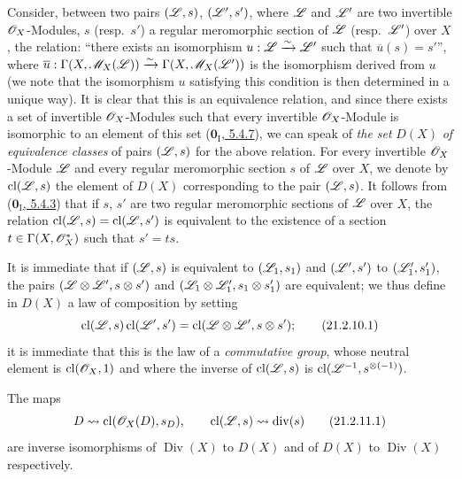 \begin{env}[21.2.10]
\label{IV.21.2.10}
Consider, between two pairs $(\mathscr{L},s)$, $(\mathscr{L}',s')$, where $\mathscr{L}$ and $\mathscr{L}'$ are two invertible $\mathscr{O}_X$-Modules, $s$ (resp.\ $s'$) a regular meromorphic section of $\mathscr{L}$ (resp.\ $\mathscr{L}'$) over $X$, the relation:
``there exists an isomorphism $u:\mathscr{L}\xrightarrow{\sim}\mathscr{L}'$ such that $\overline{u}(s)=s'$'',
where $\overline{u}:\Gamma(X,\mathscr{M}_X(\mathscr{L}))\xrightarrow{\sim}\Gamma(X,\mathscr{M}_X(\mathscr{L}'))$ is the isomorphism derived from $u$ (we note that the isomorphism $u$ satisfying this condition is then determined in a unique way).
It is clear that this is an equivalence relation, and since there exists a set of invertible $\mathscr{O}_X$-Modules such that every invertible $\mathscr{O}_X$-Module is isomorphic to an element of this set (\hyperref[0.5.4.7]{$\mathbf{0}_{\mathrm{I}}$, 5.4.7}), we can speak of \emph{the set} $D(X)$ \emph{of equivalence classes} of pairs $(\mathscr{L},s)$ for the above relation.
For every invertible $\mathscr{O}_X$-Module $\mathscr{L}$ and every regular meromorphic section
$s$ of $\mathscr{L}$ over $X$, we denote by $\operatorname{cl}(\mathscr{L},s)$ the element of $D(X)$ corresponding to the pair $(\mathscr{L},s)$.
It follows from (\hyperref[0.5.4.3]{$\mathbf{0}_{\mathrm{I}}$, 5.4.3}) that if $s$, $s'$ are two regular meromorphic sections of $\mathscr{L}$ over $X$, the relation $\operatorname{cl}(\mathscr{L},s)=\operatorname{cl}(\mathscr{L},s')$ is equivalent to the existence of a section $t\in\Gamma(X,\mathscr{O}_X^*)$ such that $s'=ts$.

It is immediate that if $(\mathscr{L},s)$ is equivalent to $(\mathscr{L}_1,s_1)$ and $(\mathscr{L}',s')$ to $(\mathscr{L}_1',s_1')$, the pairs $(\mathscr{L}\otimes\mathscr{L}',s\otimes s')$ and $(\mathscr{L}_1\otimes\mathscr{L}_1',s_1\otimes s_1')$ are equivalent;
we thus define in $D(X)$ a law of composition by setting
\[
\label{IV.21.2.10.1}
  \operatorname{cl}(\mathscr{L},s)\operatorname{cl}(\mathscr{L}',s')=\operatorname{cl}(\mathscr{L}\otimes\mathscr{L}',s\otimes s');
  \tag{21.2.10.1}
\]
it is immediate that this is the law of a \emph{commutative group}, whose neutral element is $\operatorname{cl}(\mathscr{O}_X,1)$ and where the inverse of $\operatorname{cl}(\mathscr{L},s)$ is $\operatorname{cl}(\mathscr{L}^{-1},s^{\otimes(-1)})$.
\end{env}

\begin{proposition}[21.2.11]
\label{IV.21.2.11}
The maps
\[
\label{IV.21.2.11.1}
  D\leadsto\operatorname{cl}(\mathscr{O}_X(D),s_D),\qquad \operatorname{cl}(\mathscr{L},s)\leadsto\operatorname{div}(s)
  \tag{21.2.11.1}
\]
are inverse isomorphisms of $\operatorname{Div}(X)$ to $D(X)$ and of $D(X)$ to $\operatorname{Div}(X)$ respectively.
\end{proposition}

